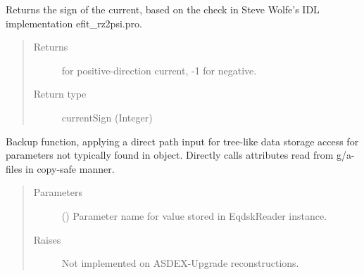 \documentclass[letterpaper,10pt,english]{sphinxmanual}
\begin{document}
\begin{fulllineitems}
\begin{fulllineitems}
\begin{quote}
\begin{description}
\end{description}\end{quote}

\end{fulllineitems}


\begin{fulllineitems}
\label{\detokenize{eqtools:eqtools.AUGData.AUGDDData.getCurrentSign}}
Returns the sign of the current, based on the check in Steve Wolfe’s
IDL implementation efit\_rz2psi.pro.
\begin{quote}\begin{description}
\item[{Returns}]  for positive-direction current, -1 for negative.

\item[{Return type}] \leavevmode
currentSign (Integer)

\end{description}\end{quote}

\end{fulllineitems}


\begin{fulllineitems}
\label{\detokenize{eqtools:eqtools.AUGData.AUGDDData.getParam}}
Backup function, applying a direct path input for tree-like data
storage access for parameters not typically found in
 object.
Directly calls attributes read from g/a-files in copy-safe manner.
\begin{quote}\begin{description}
\item[{Parameters}] \leavevmode
{} () \textendash{} Parameter name for value stored in EqdskReader
instance.

\item[{Raises}] \leavevmode
{} \textendash{} Not implemented on ASDEX-Upgrade reconstructions.


\end{description}
\end{quote}
\end{fulllineitems}
\end{fulllineitems}
\end{document}
